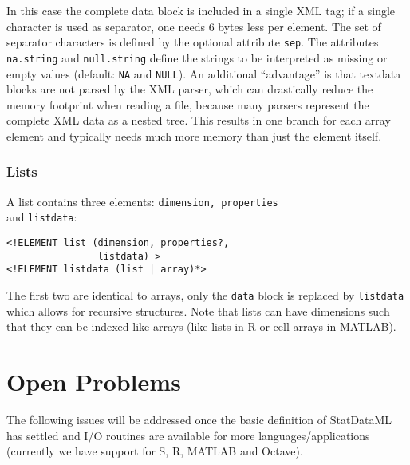 \documentclass[a4paper]{article}
\begin{document}
In this case the complete data block is included in a single XML tag;
if a single character is used as separator, one needs 6 bytes less per
element.  The set of separator characters is defined by the optional
attribute \texttt{sep}. The attributes \texttt{na.string} and
\texttt{null.string} define the strings to be interpreted as missing
or empty values (default: \texttt{NA} and \texttt{NULL}). An
additional ``advantage'' is that textdata blocks are not parsed by the
XML parser, which can drastically reduce the memory footprint when
reading a file, because many parsers represent the complete XML data
as a nested tree. This results in one branch for each array element
and typically needs much more memory than just the element itself.

\subsubsection{Lists}

A list contains three elements: \texttt{dimension, properties} \\ 
and \texttt{listdata}:

\begin{verbatim}              
<!ELEMENT list (dimension, properties?, 
                listdata) >
<!ELEMENT listdata (list | array)*> 
\end{verbatim}

The first two are identical to
arrays, only the \texttt{data} block is replaced by \texttt{listdata}
which allows for recursive structures. Note that lists can have
dimensions such that they can be indexed like arrays (like lists in R
or cell arrays in MATLAB).

\section{Open Problems}

The following issues will be addressed once the basic definition of
StatDataML has settled and I/O routines are available for more
languages/applications (currently we have support for S, R, MATLAB and
Octave).
\end{document}
